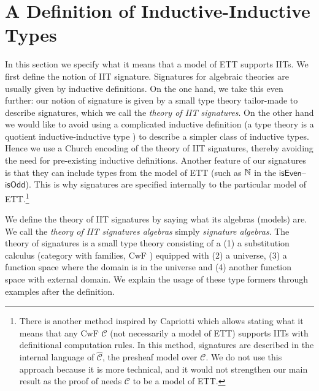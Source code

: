 \documentclass[a4paper,UKenglish,cleveref, autoref]{lipics-v2019}
\begin{document}

\section{A Definition of Inductive-Inductive Types}
\label{sec:theory_of_signatures}

In this section we specify what it means that a model of ETT supports
IITs. We first define the notion of IIT signature. Signatures for
algebraic theories are usually given by inductive definitions. On the
one hand, we take this even further: our notion of signature is given
by a small type theory tailor-made to describe signatures, which we call
the \emph{theory of IIT signatures}. On the other hand we would
like to avoid using a complicated inductive definition (a type theory
is a quotient inductive-inductive type \cite{ttintt}) to describe a
simpler class of inductive types. Hence we use a Church encoding
\cite{DBLP:conf/lics/AwodeyFS18} of the theory of IIT signatures, thereby
avoiding the need for pre-existing inductive definitions. Another
feature of our signatures is that they can include types from the
model of ETT (such as $\mathbb{N}$ in the
$\mathsf{isEven}$--$\mathsf{isOdd}$). This is why signatures are
specified internally to the particular model of ETT.\footnote{There is
  another method inspired by Capriotti \cite{paolo} which allows
  stating what it means that any CwF $\mathcal{C}$ (not necessarily a
  model of ETT) supports IITs with definitional computation rules. In
  this method, signatures are described in the internal language of
  $\hat{\mathcal{C}}$, the presheaf model over $\mathcal{C}$. We do not
  use this approach because it is more technical, and it would not
  strengthen our main result  as the proof of
   needs $\mathcal{C}$ to be a model of ETT.}

We define the theory of IIT signatures by saying what its algebras
(models) are. We call the \emph{theory of IIT signatures algebras}
simply \emph{signature algebras}. The theory of signatures is a small
type theory consisting of a (1) a substitution calculus (category with
families, CwF \cite{Dybjer96internaltype}) equipped with (2) a
universe, (3) a function space where the domain is in the universe and
(4) another function space with external domain. We explain the usage
of these type formers through examples after the definition.
\end{document}
